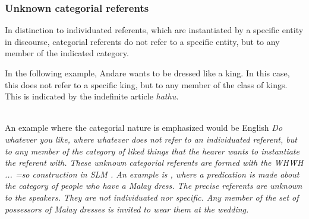 \subsubsection{Unknown categorial referents}\label{sec:func:Unknowncategorialreferents}
In distinction to individuated referents, which are instantiated by a specific entity in discourse, categorial referents do not refer to a specific entity, but to any member of the indicated category.

In the following example, Andare wants to be dressed like a king. In this case, this does not refer to a specific king, but to any member of the class of kings. This is indicated by the indefinite article \em hathu\em.


\\


An example where the categorial nature is emphasized would be  English   \em Do whatever you like\em, where \em whatever \em does not refer to an individuated referent, but to any member of the category of liked things that the hearer wants to instantiate the referent with. These unknown categorial referents are formed with the WH\~ WH ... \em=so \em  construction in SLM . An example is
, where a predication is made about the category of people who have a Malay dress. The precise referents are unknown to the speakers. They are not individuated nor specific. Any member of the set of possessors of Malay dresses is invited to wear them at the wedding.



